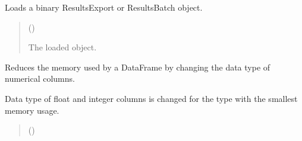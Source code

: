 \documentclass[letterpaper,10pt,english]{sphinxmanual}
\begin{document}
\begin{fulllineitems}
\begin{fulllineitems}
\end{fulllineitems}


\begin{fulllineitems}
\label{\detokenize{generated/tamos.data_IO.ResultsBatch:tamos.data_IO.ResultsBatch.load_object}}
\pysigstartsignatures
{}
\pysigstopsignatures
\sphinxAtStartPar
Loads a binary ResultsExport or ResultsBatch object.
\begin{quote}\begin{description}
\sphinxAtStartPar
{} () \textendash{} 

\sphinxAtStartPar
The loaded object.

\end{description}\end{quote}

\end{fulllineitems}


\begin{fulllineitems}
\label{\detokenize{generated/tamos.data_IO.ResultsBatch:tamos.data_IO.ResultsBatch.reduce_memory}}
\pysigstartsignatures
{}
\pysigstopsignatures
\sphinxAtStartPar
Reduces the memory used by a DataFrame by changing the data type of numerical columns.

\sphinxAtStartPar
Data type of float and integer columns is changed for the type with the smallest memory usage.
\begin{quote}\begin{description}
\sphinxAtStartPar
{} () \textendash{} 


\end{description}
\end{quote}
\end{fulllineitems}
\end{fulllineitems}
\end{document}
